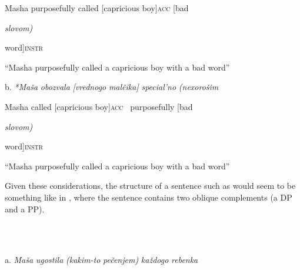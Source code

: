 \documentclass[output=paper,modfonts, nonflat]{langsci/langscibook}
\begin{document}
\begin{styleinnerExample}
    Masha purposefully called      [capricious boy]\textsc{acc} [bad
\end{styleinnerExample}

\begin{styleinnerExample}
    \textit{slovom)}
\end{styleinnerExample}

\begin{styleinnerExample}
    word]\textsc{instr}
\end{styleinnerExample}

\begin{styleinnerExample}
    “Masha purposefully called a capricious boy with a bad word”
\end{styleinnerExample}

\begin{styleinnerExample}
  b.  \textit{*Maša}  \textit{obozvala} \textit{[vrednogo} \textit{malčika]}  \textit{special’no}      \textit{(nexorošim} 
\end{styleinnerExample}

\begin{styleinnerExample}
      Masha called     [capricious boy]\textsc{acc~} purposefully  [bad
\end{styleinnerExample}

\begin{styleinnerExample}
    \textit{slovom)}
\end{styleinnerExample}

\begin{styleinnerExample}
    word]\textsc{instr}
\end{styleinnerExample}

\begin{styleinnerExample}
    “Masha purposefully called a capricious boy with a bad word”
\end{styleinnerExample}

Given these considerations, the structure of a sentence such as  would seem to be something like in , where the sentence contains two oblique complements (a DP and a PP).

\begin{styleinnerExample}
\ea%
    \label{ex:key:52}
    \gll\\
        \\
    \glt
    \z

           a.  \textit{Maša}   \textit{ugostila} \textit{(kakim-to} \textit{pečenjem)}      \textit{každogo} \textit{rebenka}
\end{styleinnerExample}
\end{document}
